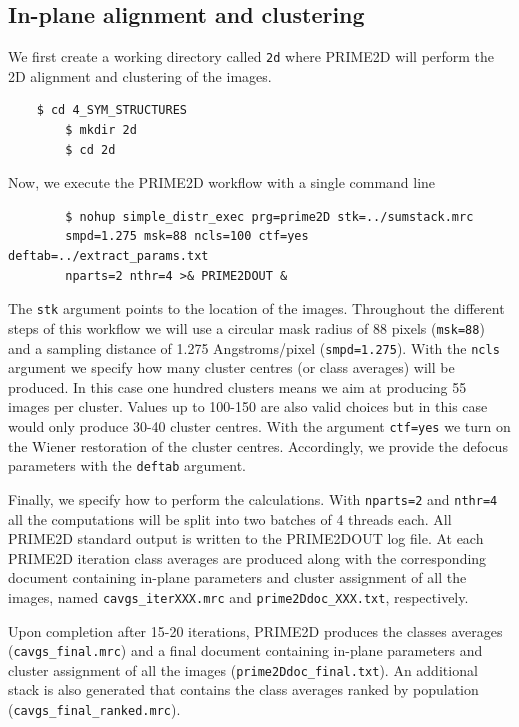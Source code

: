 \documentclass[a4paper,11pt]{article}
\begin{document}
\subsection{In-plane alignment and clustering}
We first create a working directory called \texttt{2d} where PRIME2D will perform the 2D alignment and clustering of the images.
\begin{verbatim}
	$ cd 4_SYM_STRUCTURES
        $ mkdir 2d
        $ cd 2d
\end{verbatim}
Now, we execute the PRIME2D workflow with a single command line
\begin{verbatim}
        $ nohup simple_distr_exec prg=prime2D stk=../sumstack.mrc 
        smpd=1.275 msk=88 ncls=100 ctf=yes deftab=../extract_params.txt 
        nparts=2 nthr=4 >& PRIME2DOUT &
\end{verbatim}
The \texttt{stk} argument points to the location of the images. Throughout the different steps of this workflow we will use a circular mask radius of 88 pixels (\texttt{msk=88}) and a sampling distance of 1.275 Angstroms/pixel (\texttt{smpd=1.275}). With the \texttt{ncls} argument we specify how many cluster centres (or class averages) will be produced. In this case one hundred clusters means we aim at producing 55 images per cluster. Values up to 100-150 are also valid choices but in this case would only produce 30-40 cluster centres. With the argument \texttt{ctf=yes} we turn on the Wiener restoration of the cluster centres. Accordingly, we provide the defocus parameters with the \texttt{deftab} argument.

Finally, we specify how to perform the calculations. With \texttt{nparts=2} and \texttt{nthr=4} all the computations will be split into two batches of 4 threads each. All PRIME2D standard output is written to the PRIME2DOUT log file. At each PRIME2D iteration class averages are produced along with the corresponding document containing in-plane parameters and cluster assignment of all the images, named \texttt{cavgs\_iterXXX.mrc} and \texttt{prime2Ddoc\_XXX.txt}, respectively.

Upon completion after 15-20 iterations, PRIME2D produces the classes averages (\texttt{cavgs\_final.mrc}) and a final document containing in-plane parameters and cluster assignment of all the images (\texttt{prime2Ddoc\_final.txt}). An additional stack is also generated that contains the class averages ranked by population (\texttt{cavgs\_final\_ranked.mrc}).
\end{document}

